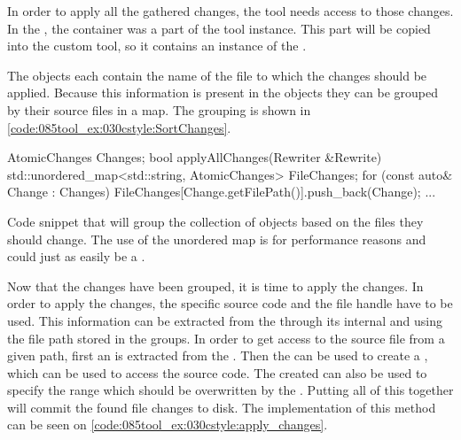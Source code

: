 In order to apply all the gathered changes, the tool needs access to those changes. In the , the  container was a part of the tool instance. This part will be copied into the custom tool, so it contains an instance of the . 

The  objects each contain the name of the file to which the changes should be applied. Because this information is present in the objects they can be grouped by their source files in a map. The grouping is shown in \cref{code:085tool_ex:030cstyle:SortChanges}.

\begin{listing}[H]
    \begin{cppcode}
AtomicChanges Changes;
bool applyAllChanges(Rewriter &Rewrite) {
    std::unordered_map<std::string, AtomicChanges> FileChanges;
    for (const auto& Change : Changes) {
        FileChanges[Change.getFilePath()].push_back(Change);
    }
    ...
}
    \end{cppcode}
    \caption{Code snippet that will group the collection of  objects based on the files they should change. The use of the unordered map is for performance reasons and could just as easily be a .}
    \label{code:085tool_ex:030cstyle:SortChanges}
\end{listing}

Now that the changes have been grouped, it is time to apply the changes. In order to apply the changes, the specific source code and the file handle have to be used. This information can be extracted from the  through its internal  and  using the file path stored in the groups. In order to get access to the source file from a given path, first an  is extracted from the . Then the  can be used to create a , which can be used to access the source code. The created  can also be used to specify the range which should be overwritten by the . Putting all of this together will commit the found file changes to disk. The implementation of this method can be seen on \cref{code:085tool_ex:030cstyle:apply_changes}.

